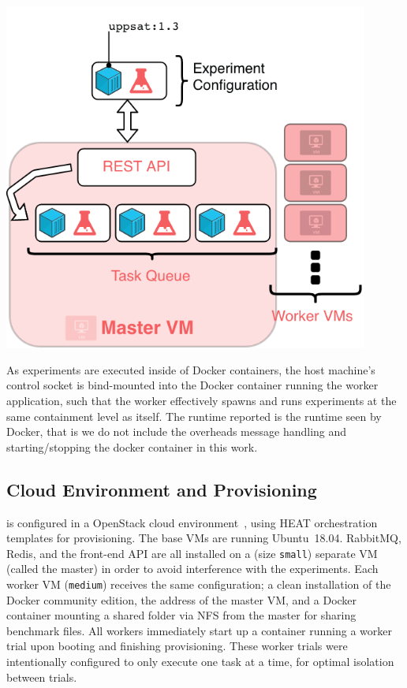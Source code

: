 \documentclass[a4paper]{IEEEtran}
\begin{document}
\begin{Figure}
  \centering
  \includegraphics[width=0.9\textwidth]{architecture}
  \label{fig:architecture}
\end{Figure}

As experiments are executed inside of Docker containers, the host
machine's control socket is bind-mounted into the Docker container
running the worker application, such that the worker effectively
spawns and runs experiments at the same containment level as
itself. The runtime reported is the runtime seen by Docker, that is we
do not include the overheads message handling and starting/stopping
the docker container in this work.

\subsection{Cloud Environment and Provisioning}

\testbench{} is configured in a OpenStack cloud environment~\cite{openstack},
using HEAT orchestration templates for provisioning. The base VMs are running
Ubuntu~18.04. RabbitMQ, Redis, and the front-end API are all installed
on a (size \texttt{small}) separate VM (called the master) in order to avoid
interference with the experiments. Each worker VM (\texttt{medium}) receives the
same configuration; a clean installation of the Docker community edition, the
address of the master VM, and a Docker container mounting a shared folder via
NFS from the master for sharing benchmark files. All workers immediately start
up a container running a worker trial upon booting and finishing
provisioning. These worker trials were intentionally configured to only
execute one task at a time, for optimal isolation between trials.
\end{document}
